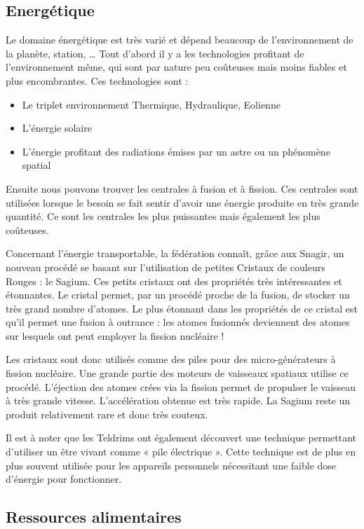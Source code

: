 \begin{multicols}{2}
\subsection{Energétique}

Le domaine énergétique est très varié et dépend beaucoup de l’environnement de la planète, station, … Tout d’abord il y a les technologies profitant de l’environnement même, qui sont par nature peu coûteuses mais moins fiables et plus encombrantes. Ces technologies sont :

\begin{itemize}
	\item Le triplet environnement Thermique, Hydraulique, Eolienne
	\item L’énergie solaire
	\item L’énergie profitant des radiations émises par un astre ou un phénomène spatial
\end{itemize}

Ensuite nous pouvons trouver les centrales à fusion et à fission. Ces centrales sont utilisées lorsque le besoin se fait sentir d’avoir une énergie produite en très grande quantité. Ce sont les centrales les plus puissantes mais également les plus coûteuses. 

Concernant l’énergie transportable, la fédération connaît, grâce aux Snagir, un nouveau procédé se basant sur l’utilisation de petites Cristaux de couleurs Rouges : le Sagium. Ces petits cristaux ont des propriétés très intéressantes et étonnantes. Le cristal permet, par un procédé proche de la fusion, de stocker un très grand nombre d’atomes. Le plus étonnant dans les propriétés de ce cristal est qu’il permet une fusion à outrance : les atomes fusionnés deviennent des atomes sur lesquels ont peut employer la fission nucléaire ! 

Les cristaux sont donc utilisés comme des piles pour des micro-générateurs à fission nucléaire. Une grande partie des moteurs de vaisseaux spatiaux utilise ce procédé. L’éjection des atomes crées via la fission permet de propulser le vaisseau à très grande vitesse. L’accélération obtenue est très rapide. La Sagium reste un produit relativement rare et donc très couteux.

Il est à noter que les Teldrims ont également découvert une technique permettant d’utiliser un être vivant comme « pile électrique ». Cette technique est de plus en plus souvent utilisée pour les appareils personnels nécessitant une faible dose d’énergie pour fonctionner.

\subsection{Ressources alimentaires}


\end{multicols}
